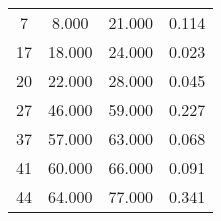 % 
\begin{tabular}{cccc}
  \hline
  \hline
7 & 8.000 & 21.000 & 0.114 \\ 
  17 & 18.000 & 24.000 & 0.023 \\ 
  20 & 22.000 & 28.000 & 0.045 \\ 
  27 & 46.000 & 59.000 & 0.227 \\ 
  37 & 57.000 & 63.000 & 0.068 \\ 
  41 & 60.000 & 66.000 & 0.091 \\ 
  44 & 64.000 & 77.000 & 0.341 \\ 
   \hline
\end{tabular}
